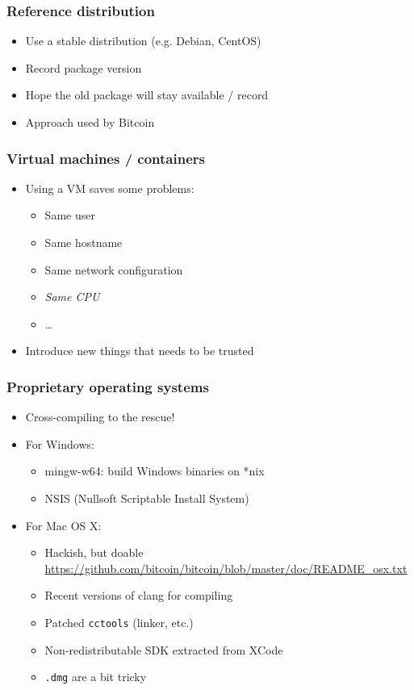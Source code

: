 \documentclass[14pt,aspectratio=169]{beamer}
\begin{document}
\begin{frame}
 \frametitle{Reference distribution}

 \begin{itemize}
  \item Use a stable distribution (e.g. Debian, CentOS)
  \item Record package version
  \item Hope the old package will stay available / record
  \item Approach used by Bitcoin
 \end{itemize}
\end{frame}

\begin{frame}
 \frametitle{Virtual machines / containers}

 \begin{itemize}
  \item Using a VM saves some problems:
   \begin{itemize}
    \item Same user
    \item Same hostname
    \item Same network configuration
    \item \textit{Same CPU}
    \item …
   \end{itemize}
  \item Introduce new things that needs to be trusted
 \end{itemize}
\end{frame}

\begin{frame}
 \frametitle{Proprietary operating systems}

 \begin{itemize}
  \item Cross-compiling to the rescue!
  \item For Windows:
   \begin{itemize}
     \item mingw-w64: build Windows binaries on *nix
     \item NSIS (Nullsoft Scriptable Install System)
   \end{itemize}
  \item For Mac OS X:
   \begin{itemize}
     \item Hackish, but doable \\
       {\footnotesize \url{https://github.com/bitcoin/bitcoin/blob/master/doc/README\_osx.txt}}
     \item Recent versions of clang for compiling
     \item Patched \texttt{cctools} (linker, etc.)
     \item Non-redistributable SDK extracted from XCode
     \item \texttt{.dmg} are a bit tricky
   \end{itemize}
 \end{itemize}
\end{frame}
\end{document}
